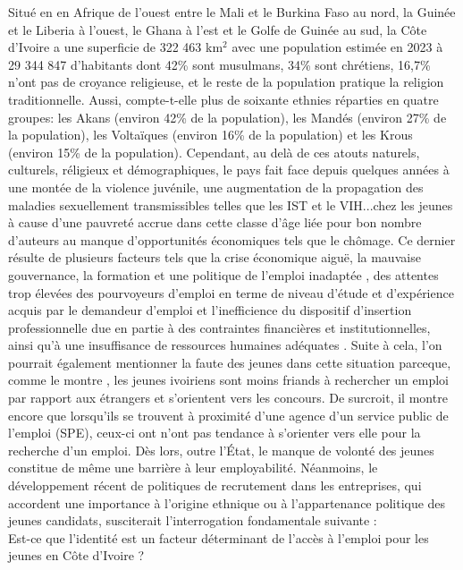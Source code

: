 \documentclass[12pt,a4paper, openany]{book}
\begin{document}
\noindent Situé en en Afrique de l'ouest entre le Mali et le Burkina Faso au nord, la Guinée et le Liberia à l'ouest, le Ghana à l'est et le Golfe de Guinée au sud, la Côte d'Ivoire a une superficie de 322 463 km$^2$ avec une population estimée en 2023 à 29 344 847 d’habitants dont 42\% sont musulmans, 34\% sont chrétiens, 16,7\% n’ont pas de croyance religieuse, et le reste de la population pratique la religion traditionnelle. Aussi, compte-t-elle plus de soixante ethnies réparties en quatre groupes: les Akans (environ 42\% de la population), les Mandés (environ 27\% de la population), les Voltaïques (environ 16\% de la population) et les Krous (environ 15\% de la population). Cependant, au delà de ces atouts naturels, culturels, réligieux et démographiques, le pays fait face depuis quelques années à une montée de la violence juvénile, une augmentation de la propagation des maladies sexuellement transmissibles telles que les IST et le VIH...chez les jeunes à cause d'une pauvreté accrue dans cette classe d'âge liée pour bon nombre d'auteurs au manque d'opportunités économiques tels que le chômage. Ce dernier résulte de plusieurs facteurs tels que la crise économique aiguë, la mauvaise gouvernance, la formation et une politique de l’emploi inadaptée \citep{simeon2018jeunes}, des attentes trop élevées des pourvoyeurs d'emploi en terme de niveau d'étude et d'expérience acquis par le demandeur d'emploi et l’inefficience du dispositif d’insertion professionnelle due en partie à des contraintes financières et institutionnelles, ainsi qu’à une insuffisance de ressources humaines adéquates \citep{n2015employabilite}. Suite à cela, l'on pourrait également mentionner la faute des jeunes dans cette situation parceque, comme le montre \cite{n2015analyse}, les jeunes ivoiriens sont moins friands à rechercher un emploi par rapport aux étrangers et s'orientent vers les concours. De surcroit, il montre encore que lorsqu'ils se trouvent à proximité d'une agence d’un service public de l’emploi (SPE), ceux-ci ont n'ont pas tendance à s'orienter vers elle pour la recherche d'un emploi. Dès lors, outre l'\'Etat, le manque de volonté des jeunes constitue de même une barrière à leur employabilité. Néanmoins, le développement récent de politiques de recrutement dans les entreprises, qui accordent une importance à l'origine ethnique ou à l'appartenance politique des jeunes candidats, susciterait l'interrogation fondamentale suivante :\\

Est-ce que l'identité est un facteur déterminant de l'accès à l'emploi pour les jeunes en Côte d'Ivoire ?\\
\end{document}
